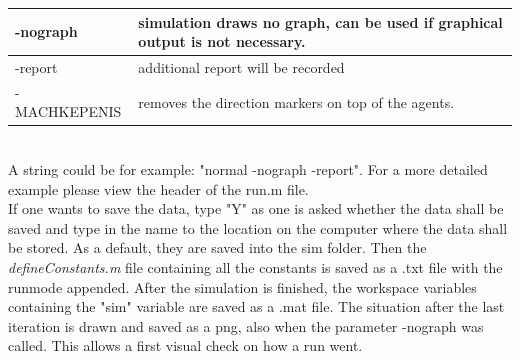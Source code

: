 \begin{tabular}{|p{3cm}|p{10cm}|}
      \hline
      -nograph & simulation draws no graph, can be used if graphical output is not necessary.\\ \hline
      -report & additional report will be recorded\\ \hline
      -MACHKEPENIS & removes the direction markers on top of the agents.\\
      \hline
\end{tabular}\\

\noi A string could be for example: "normal -nograph -report". For a more detailed example please view the header of the run.m file. \\

\noi If one wants to save the data, type "Y" as one is asked whether the data shall be saved and type in the name to the location on the computer where the data shall be stored. As a default, they are saved into the sim folder. Then the \textit{defineConstants.m} file containing all the constants is saved as a .txt file with the runmode appended. After the simulation is finished, the workspace variables containing the "sim" variable are saved as a .mat file. The situation after the last iteration is drawn and saved as a png, also when the parameter -nograph was called. This allows a first visual check on how a run went.


